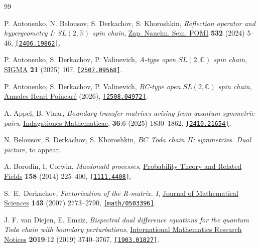 \documentclass[11pt]{article}
\numberwithin{equation}{section}
\theoremstyle{plain}
\theoremstyle{definition}
\begin{document}
\begin{thebibliography}{99}

	 P. Antonenko, N. Belousov, S. Derkachov, S. Khoroshkin,  
	\textit{Reflection operator and hypergeometry I: $SL(2, \mathbb{R})$ spin chain}, \href{https://www.mathnet.ru/php/archive.phtml?wshow=paper&jrnid=znsl&paperid=7450&option_lang=eng}{Zap. Nauchn. Sem. POMI} \textbf{532} (2024) 5--46, \href{https://doi.org/10.48550/arXiv.2406.19862}{\tt [2406.19862]}.
	
	 P. Antonenko, S. Derkachov, P. Valinevich, \textit{A-type open $SL(2, \mathbb{C})$ spin chain}, \href{https://doi.org/10.3842/SIGMA.2025.107}{SIGMA} \textbf{21} (2025) 107, \href{https://doi.org/10.48550/arXiv.2507.09568}{\tt [2507.09568]}.
	
	 P. Antonenko, S. Derkachov, P. Valinevich, \textit{BC-type open $SL(2, \mathbb{C})$ spin chain}, \href{https://doi.org/10.1007/s00023-025-01653-0}{Annales Henri Poincar\'e} (2026), \href{https://doi.org/10.48550/arXiv.2508.04972}{\tt [2508.04972]}.
	
	 A. Appel, B. Vlaar, \textit{Boundary transfer matrices arising from quantum symmetric pairs}, \href{https://doi.org/10.1016/j.indag.2025.05.008}{Indagationes Mathematicae}, \textbf{36}:6 (2025) 1830--1862, \href{https://doi.org/10.48550/arXiv.2410.21654}{\tt [2410.21654]}.
	
	 N. Belousov, S. Derkachov, S. Khoroshkin, \textit{$BC$ Toda chain II: symmetries. Dual picture}, to appear.
	
	 A. Borodin, I. Corwin, \textit{Macdonald processes}, \href{https://doi.org/10.1007/s00440-013-0482-3}{Probability Theory and Related Fields} \textbf{158} (2014) 225--400, \href{https://doi.org/10.48550/arXiv.1111.4408}{\tt [1111.4408]}.

	 S.~E.~Derkachov, \textit{Factorization of the R-matrix. I}, \href{https://doi.org/10.1007/s10958-007-0164-8}{Journal of Mathematical Sciences} \textbf{143} (2007) 2773--2790, \href{https://doi.org/10.48550/arXiv.math/0503396}{\tt [math/0503396]}.

	 J. F. van Diejen, E. Emsiz, \textit{Bispectral dual difference equations for the quantum Toda chain with boundary perturbations}, \href{https://doi.org/10.1093/imrn/rnx219}{International Mathematics Research Notices} \textbf{2019}:12 (2019) 3740--3767, \href{https://doi.org/10.48550/arXiv.1903.01827}{\tt [1903.01827]}.
	

\end{thebibliography}
\end{document}
